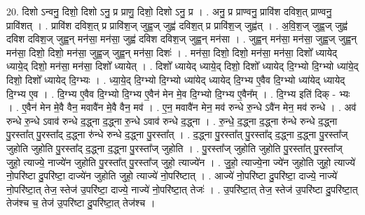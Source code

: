 \documentclass[17pt]{extarticle}
\begin{document}
20. दिशो ऽन्वनु॒ दिशो॒ दिशो ऽनु॒ प्र प्राणु॒ दिशो॒ दिशो ऽनु॒ प्र । . अनु॒ प्र प्राण्वनु॒ प्रावि॑श दविश॒त् प्राण्वनु॒ प्रावि॑शत् । . प्रावि॑श दविश॒त् प्र प्रावि॑श॒ज् जुह्व॒ज् जुह्व॑ दविश॒त् प्र प्रावि॑श॒ज् जुह्व॑त् । . अ॒वि॒श॒ज् जुह्व॒ज् जुह्व॑ दविश दविश॒ज् जुह्व॒न् मन॑सा॒ मन॑सा॒ जुह्व॑ दविश दविश॒ज् जुह्व॒न् मन॑सा । . जुह्व॒न् मन॑सा॒ मन॑सा॒ जुह्व॒ज् जुह्व॒न् मन॑सा॒ दिशो॒ दिशो॒ मन॑सा॒ जुह्व॒ज् जुह्व॒न् मन॑सा॒ दिशः॑ । . मन॑सा॒ दिशो॒ दिशो॒ मन॑सा॒ मन॑सा॒ दिशो᳚ ध्यायेद् ध्याये॒द् दिशो॒ मन॑सा॒ मन॑सा॒ दिशो᳚ ध्यायेत् । . दिशो᳚ ध्यायेद् ध्याये॒द् दिशो॒ दिशो᳚ ध्यायेद् दि॒ग्भ्यो दि॒ग्भ्यो ध्या॑ये॒द् दिशो॒ दिशो᳚ ध्यायेद् दि॒ग्भ्यः । . ध्या॒ये॒द् दि॒ग्भ्यो दि॒ग्भ्यो ध्या॑येद् ध्यायेद् दि॒ग्भ्य ए॒वैव दि॒ग्भ्यो ध्या॑येद् ध्यायेद् दि॒ग्भ्य ए॒व । . दि॒ग्भ्य ए॒वैव दि॒ग्भ्यो दि॒ग्भ्य ए॒वैन॑ मेन मे॒व दि॒ग्भ्यो दि॒ग्भ्य ए॒वैन᳚म् । . दि॒ग्भ्य इति॑ दिक् - भ्यः । . ए॒वैन॑ मेन मे॒वै वैन॒ मवावै॑न मे॒वै वैन॒ मव॑ । . ए॒न॒ मवावै॑न मेन॒ मव॑ रुन्धे रु॒न्धे ऽवै॑न मेन॒ मव॑ रुन्धे । . अव॑ रुन्धे रु॒न्धे ऽवाव॑ रुन्धे द॒द्ध्ना द॒द्ध्ना रु॒न्धे ऽवाव॑ रुन्धे द॒द्ध्ना । . रु॒न्धे॒ द॒द्ध्ना द॒द्ध्ना रु॑न्धे रुन्धे द॒द्ध्ना पु॒रस्ता᳚त् पु॒रस्ता᳚द् द॒द्ध्ना रु॑न्धे रुन्धे द॒द्ध्ना पु॒रस्ता᳚त् । . द॒द्ध्ना पु॒रस्ता᳚त् पु॒रस्ता᳚द् द॒द्ध्ना द॒द्ध्ना पु॒रस्ता᳚ज् जुहोति जुहोति पु॒रस्ता᳚द् द॒द्ध्ना द॒द्ध्ना पु॒रस्ता᳚ज् जुहोति । . पु॒रस्ता᳚ज् जुहोति जुहोति पु॒रस्ता᳚त् पु॒रस्ता᳚ज् जुहो॒ त्याज्ये॒ नाज्ये॑न जुहोति पु॒रस्ता᳚त् पु॒रस्ता᳚ज् जुहो॒ त्याज्ये॑न । . जु॒हो॒ त्याज्ये॒ना ज्ये॑न जुहोति जुहो॒ त्याज्ये॑ नो॒परि॑ष्टा दु॒परि॑ष्टा॒ दाज्ये॑न जुहोति जुहो॒ त्याज्ये॑ नो॒परि॑ष्टात् । . आज्ये॑ नो॒परि॑ष्टा दु॒परि॑ष्टा॒ दाज्ये॒ नाज्ये॑ नो॒परि॑ष्टा॒त् तेज॒ स्तेज॑ उ॒परि॑ष्टा॒ दाज्ये॒ नाज्ये॑ नो॒परि॑ष्टा॒त् तेजः॑ । . उ॒परि॑ष्टा॒त् तेज॒ स्तेज॑ उ॒परि॑ष्टा दु॒परि॑ष्टा॒त् तेज॑श्च च॒ तेज॑ उ॒परि॑ष्टा दु॒परि॑ष्टा॒त् तेज॑श्च । \newline
\end{document}
